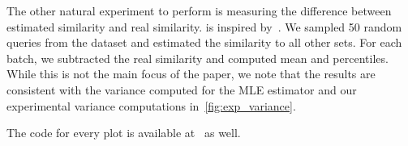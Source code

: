 The other natural experiment to perform is measuring the difference between estimated similarity and real similarity.
 is inspired by~\cite{thorup2013bottom}.
We sampled 50 random queries from the dataset and estimated the similarity to all other sets.
For each batch, we subtracted the real similarity and computed mean and percentiles.
While this is not the main focus of the paper, we note that the results are consistent with the variance computed for the MLE estimator and our experimental variance computations in~\cref{fig:exp_variance}.

The code for every plot is available at~\cite{codes} as well.

